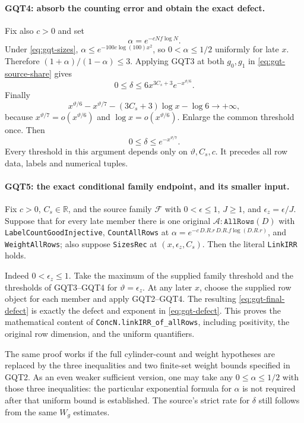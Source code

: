 \paragraph{GQT4: absorb the counting error and obtain the exact defect.}
\label{claim:GQT4}
Fix also $c>0$ and set
\[
                 \alpha=e^{-cNf\log N}.
\]
Under \eqref{eq:gqt-sizes},
$\alpha\le e^{-100c\log(100)x^2}$, so $0<\alpha\le1/2$
uniformly for late $x$. Therefore
$(1+\alpha)/(1-\alpha)\le3$. Applying GQT3 at both $g_0,g_1$
in \eqref{eq:gqt-source-share} gives
\[
          0\le\delta\le6x^{3C_s+3}e^{-x^{\vartheta/6}}.
\]
Finally
\[
 x^{\vartheta/6}-x^{\vartheta/7}
                   -(3C_s+3)\log x-\log6\longrightarrow+\infty,
\]
because $x^{\vartheta/7}=o(x^{\vartheta/6})$ and
$\log x=o(x^{\vartheta/6})$. Enlarge the common threshold once.
Then
\begin{equation}\label{eq:gqt-final-defect}
                         0\le\delta\le e^{-x^{\vartheta/7}}.
\end{equation}
Every threshold in this argument depends only on $\vartheta,C_s,c$.
It precedes all row data, labels and numerical tuples.

\paragraph{GQT5: the exact conditional family endpoint, and its smaller input.}
\label{claim:GQT5}
Fix $c>0$, $C_s\in\mathbb R$, and the source family $\mathcal F$
with $0<\epsilon\le1$,
$J\ge1$, and $\epsilon_z=\epsilon/J$. Suppose that for every late
member there is one original $\mathcal A:\texttt{AllRows}(D)$ with
\texttt{LabelCountGoodInjective}, \texttt{CountAllRows} at
$\alpha=e^{-c\,D.R.r\,D.R.f\log(D.R.r)}$, and
\texttt{WeightAllRows}; also suppose \texttt{SizesRec} at
$(x,\epsilon_z,C_s)$. Then the literal \texttt{LinkIRR} holds.

Indeed $0<\epsilon_z\le1$. Take the maximum of the supplied
family threshold and the thresholds of GQT3--GQT4 for
$\vartheta=\epsilon_z$. At any later $x$, choose the supplied
row object for each member and apply GQT2--GQT4. The resulting
\eqref{eq:gqt-final-defect} is exactly the defect and exponent
in \eqref{eq:gqt-defect}. This proves the mathematical content
of \texttt{ConcN.linkIRR\_of\_allRows}, including positivity,
the original row dimension, and the uniform quantifiers.

The same proof works if the full cylinder-count and weight hypotheses
are replaced by the three inequalities and two finite-set weight
bounds specified in GQT2. As an even weaker sufficient version, one
may take any $0\le\alpha\le1/2$ with those three inequalities:
the particular exponential formula for $\alpha$ is not required
after that uniform bound is established. The source's strict rate
for $\delta$ still follows from the same $W_g$ estimates.


